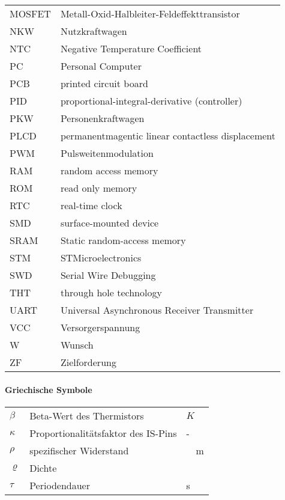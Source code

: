 \begin{table}[H]
\begin{tabular}{p{2cm}p{15cm}}
			MOSFET\dotfill & Metall-Oxid-Halbleiter-Feldeffekttransistor\\
			NKW\dotfill & Nutzkraftwagen\\
			NTC\dotfill & Negative Temperature Coefficient\\
			PC\dotfill & Personal Computer\\
			PCB\dotfill & printed circuit board\\
			PID\dotfill & proportional-integral-derivative (controller)\\
			PKW\dotfill & Personenkraftwagen\\
			PLCD\dotfill & permanentmagentic linear contactless displacement\\
			PWM\dotfill &  Pulsweitenmodulation\\
			RAM\dotfill & random access memory\\
			ROM\dotfill & read only memory\\
			RTC\dotfill & real-time clock\\
			SMD\dotfill & surface-mounted device\\
			SRAM\dotfill & Static random-access memory\\
			STM\dotfill & STMicroelectronics\\
			SWD\dotfill & Serial Wire Debugging\\
			THT\dotfill & through hole technology\\
			UART\dotfill & Universal Asynchronous Receiver Transmitter\\
			VCC\dotfill & Versorgerspannung\\
			W\dotfill & Wunsch \\
			ZF\dotfill & Zielforderung\\
		\end{tabular}
		\label{Abkuerzung}
\end{table}


\paragraph{Griechische Symbole}
\begin{table}[H]
\centering
				\begin{tabular}{p{1.5cm}p{13.5cm}p{2cm}}
			$\beta$ \dotfill& Beta-Wert des Thermistors &  $ K $\\
			$\kappa$ & Proportionalitätsfaktor des IS-Pins & -\\
			$\rho$ \dotfill& spezifischer Widerstand & \SI{}{\Omega m}\\
			$\varrho$ \dotfill& Dichte & \SI{}{\frac{kg}{m^3}}\\
			$\tau$ \dotfill& Periodendauer &  s\\
		\end{tabular}
		\label{Abkurzung}
\end{table}

